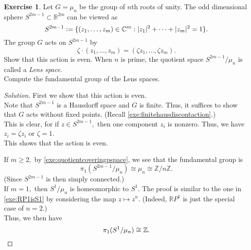 \documentclass[12pt]{article}
\theoremstyle{definition}
\numberwithin{thm}{section}
\newtheorem{exe}[thm]{Exercise}
\newenvironment{soln}{\begin{proof}[Solution]}{\end{proof}}
\begin{document}
\begin{exe}
	Let $G = \mu_n$ be the group of $n$th roots of unity. The odd dimensional sphere $S^{2m - 1} \subset \mathbb{R}^{2m}$ can be viewed as
	\begin{equation*} 
		S^{2m - 1} \vcentcolon= \{(z_1, \ldots, z_m) \in \mathbb{C}^m : |z_1|^2 + \cdots + |z_m|^2 = 1\}.
	\end{equation*}
	The group $G$ acts on $S^{2m - 1}$ by 
	\begin{equation*} 
		\zeta\cdot(z_1, \ldots, z_m) = (\zeta z_1, \ldots, \zeta z_m).
	\end{equation*}
	Show that this action is even. When $n$ is prime, the quotient space $S^{2m - 1}/\mu_n$ is called a \emph{Lens space}.\\
	Compute the fundamental group of the Lens spaces.
\end{exe}
\begin{soln}
	First we show that this action is even. \\
	Note that $S^{2m - 1}$ is a Hausdorff space and $G$ is finite. Thus, it suffices to show that $G$ acts without fixed points. (Recall \cref{exe:finitehausdiscontaction}.)\\
	This is clear, for if $z \in S^{2m - 1},$ then one component $z_i$ is nonzero. Thus, we have $z_i = \zeta z_i$ or $\zeta = 1.$\\
	This shows that the action is even. 

	If $m \ge 2,$ by \cref{exe:quotientcoveringpspace}, we see that the fundamental group is 
	\begin{equation*} 
		\pi_1(S^{2m - 1}/\mu_n) \cong \mu_n \cong \mathbb{Z}/n\mathbb{Z}.
	\end{equation*} (Since $S^{2m - 1}$ is then simply connected.) \\
	If $m = 1,$ then $S^1/\mu_n$ is homeomorphic to $S^1.$ The proof is similar to the one in \cref{exe:RP1isS1} by considering the map $z \mapsto z^n.$ (Indeed, $\mathbb{R}P^1$ is just the special case of $n = 2.$)\\
	Thus, we then have
	\begin{equation*} 
		\pi_1(S^1/\mu_n) \cong \mathbb{Z}. \qedhere
	\end{equation*}
\end{soln}
\end{document}
